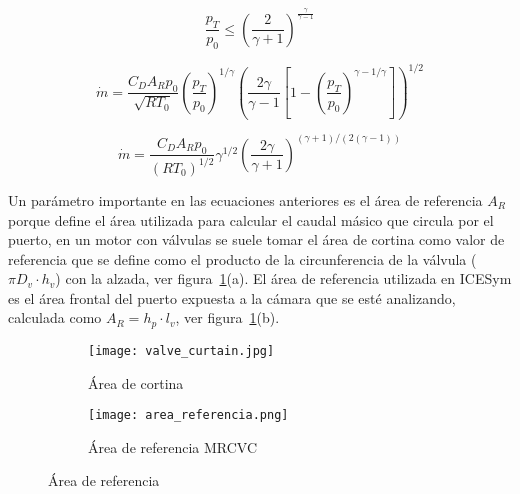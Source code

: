 \begin{equation}\label{eq:condicion_bloqueo}
  \frac{p_{T}}{p_{0}} \le {\left(\frac{2}{\gamma+1}\right)}^{\frac{\gamma}{\gamma - 1}}
\end{equation}

\begin{equation}
    \label{eq:m_no_bloqueo}
    \dot{m} = \frac{C_D A_R p_0}{\sqrt{R T_0}}
            {\left(\frac{p_T}{p_0} \right)}^{1/\gamma}
            {\left( \frac{2\gamma}{\gamma-1} \left[1- {\left(\frac{p_T}{p_0}\right)}^{{\gamma-1}/\gamma} \right] \right)}^{1/2}
\end{equation}

\begin{equation}\label{eq:m_bloqueo}
  \dot{m}=  \frac {C_D A_R p_0} {{(R T_0)}^{1/2}}
            \gamma^{1/2}
            {\left( \frac{2\gamma}{\gamma+1} \right)}^{(\gamma+1)/(2(\gamma-1))}
\end{equation}

Un parámetro importante en las ecuaciones anteriores es el área de referencia
$A_{R}$ porque define el área utilizada para calcular el caudal másico que
circula por el puerto, en un motor con válvulas se suele tomar el área de
cortina como valor de referencia que se define como el producto de la
circunferencia de la válvula ($\pi D_{v} \cdot h_{v}$) con la alzada, ver
figura~\ref{fig:area_referencia}(a).
%
El área de referencia utilizada en ICESym es el área frontal del puerto expuesta
a la cámara que se esté analizando, calculada como $A_{R} = h_{p} \cdot l_{v}$, ver
figura~\ref{fig:area_referencia}(b).

%

\begin{figure}
    \centering
    \begin{subfigure}{0.5\textwidth}
      \centering
      \texttt{[image: valve\_curtain.jpg]}
      \caption{Área de cortina}
    \end{subfigure}%
    \begin{subfigure}{0.5\textwidth}
      \centering
      \texttt{[image: area\_referencia.png]}
      \caption{Área de referencia MRCVC}
    \end{subfigure}
    \caption{Área de referencia}\label{fig:area_referencia}
\end{figure}

